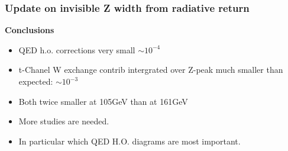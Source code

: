 \documentclass{beamer}
\begin{document}
\begin{frame}[fragile]
\frametitle{\bf Update on invisible Z width from radiative return}

{\bf Conclusions}
\begin{itemize}
\item 
 QED h.o. corrections very small $\sim 10^{-4}$
\item
 t-Chanel W exchange contrib intergrated over Z-peak
 much smaller than expected: $\sim 10^{-3}$
\item
 Both twice smaller at 105GeV than at 161GeV
\item
 More studies are needed.
\item
 In particular which QED H.O. diagrams are most important.
\end{itemize}
\end{frame}
\end{document}
